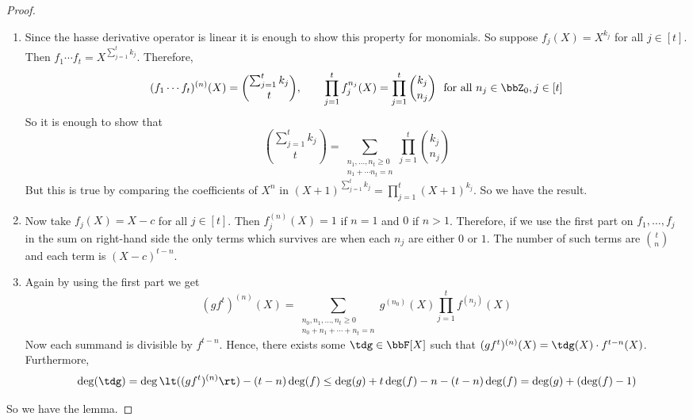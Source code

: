 \begin{proof}
  \begin{enumerate}[label=(\roman*)]
    \item Since the hasse derivative operator is linear it is enough to show this property for monomials. So suppose $f_j(X)=X^{k_j}$ for all $j\in[t]$. Then $f_1\cdots f_t=X^{\sum_{j=1}^t k_j}$. Therefore, $$(f_1\cdots f_t)^{(n)}(X)=\binom{\sum_{j=1}^t k_j}t,\qquad \prod_{j=1}^t f_j^{n_j}(X)=\prod_{j=1}^t \binom{k_j}{n_j}\ \text{ for all }n_j\in \bbZ_0, j\in[t]$$So it is enough to show that $$\binom{\sum_{j=1}^t k_j}t=\sum_{\substack{n_1,\dots, n_t\geq 0\\ n_1+\cdots n_t=n}}\prod_{j=1}^t \binom{k_j}{n_j}$$But this is true by comparing the coefficients of $X^n$ in $(X+1)^{\sum_{j=1}^t k_j}=\prod_{j=1}^t(X+1)^{k_j}$. So we have the result. 
    \item Now take $f_j(X)=X-c$ for all $j\in[t]$. Then $f_j^{(n)}(X)=1$ if $n=1$ and $0$ if $n>1$. Therefore, if we use the first part on $f_1,\dots, f_j$ in the sum on right-hand side the only terms which survives are when each $n_j$ are either $0$ or $1$. The number of such terms are $\binom{t}n$ and each term is $(X-c)^{t-n}$. 
    \item Again by using the first part we get $$(gf^t)^{(n)}(X)=\sum_{\substack{n_0,n_1,\dots, n_t\geq 0\\ n_0+n_1+\cdots +n_t=n}}g^{(n_0)}(X)\prod_{j=1}^t f^{(n_j)}(X)$$Now each summand is divisible by $f^{t-n}$. Hence, there exists some $\tdg\in\bbF[X]$ such that  $(gf^t)^{(n)}(X)=\tdg(X)\cdot f^{t-n}(X)$. Furthermore, $$\deg(\tdg)=\deg\lt( (gf^{t})^{(n)}\rt)-(t-n)\deg(f)\leq\deg(g)+t\deg(f)-n-(t-n)\deg(f)=\deg(g)+(\deg(f)-1)$$
  \end{enumerate}
  So we have the lemma. 
\end{proof}


